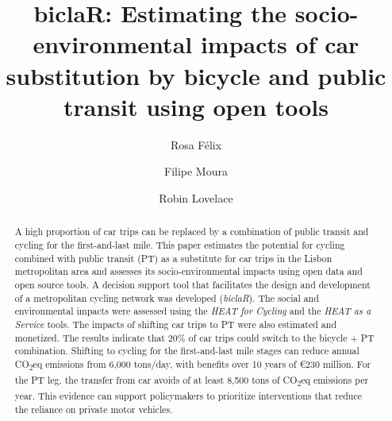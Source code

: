 \documentclass[runningheads]{llncs}
\begin{document}
\title{biclaR: Estimating the socio-environmental impacts of car
substitution by bicycle and public transit using open tools}
%
%
\author{Rosa Félix \and Filipe
Moura \and Robin
Lovelace}


%


\maketitle              %
%
\begin{abstract}
A high proportion of car trips can be replaced by a combination of
public transit and cycling for the first-and-last mile. This paper
estimates the potential for cycling combined with public transit (PT) as
a substitute for car trips in the Lisbon metropolitan area and assesses
its socio-environmental impacts using open data and open source tools. A
decision support tool that facilitates the design and development of a
metropolitan cycling network was developed (\emph{biclaR}). The social
and environmental impacts were assessed using the \emph{HEAT for
Cycling} and the \emph{HEAT as a Service} tools. The impacts of shifting
car trips to PT were also estimated and monetized. The results indicate
that 20\% of car trips could switch to the bicycle + PT combination.
Shifting to cycling for the first-and-last mile stages can reduce annual
CO\textsubscript{2}eq emissions from 6,000 tons/day, with benefits over
10 years of €230 million. For the PT leg, the transfer from car avoids
of at least 8,500 tons of CO\textsubscript{2}eq emissions per year. This
evidence can support policymakers to prioritize interventions that
reduce the reliance on private motor vehicles.


\end{abstract}
\end{document}
